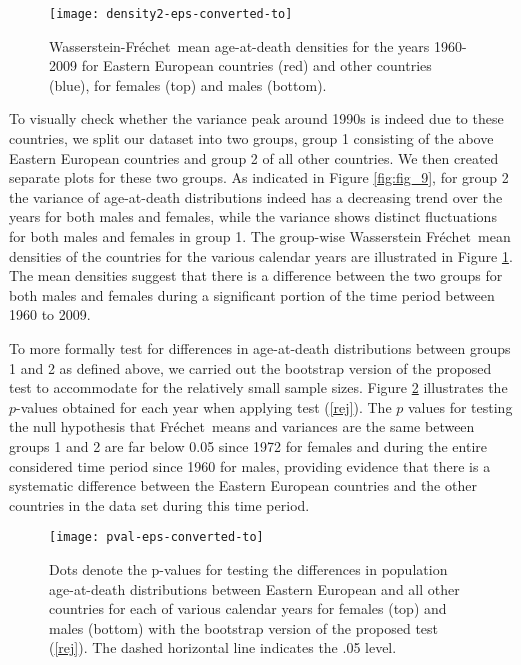 \documentclass[lineno]{biometrika}
\def\F{Fr\'{e}chet}
\begin{document}
\begin{figure}
	\centering
	\texttt{[image: density2-eps-converted-to]}
	\caption{Wasserstein-\F \ mean age-at-death densities for  the years 1960-2009 for Eastern European countries (red) and other countries (blue), for females (top) and males (bottom). }
	\label{fig:fig_10}
\end{figure}
To visually check whether the variance peak around 1990s is indeed due to these countries, we  split our dataset into two groups, group 1 consisting  of the above Eastern European countries and group 2 of all other countries. We then created separate   plots for these two groups.  As indicated in Figure \ref{fig:fig_9},  for group 2 the variance of age-at-death distributions indeed has a decreasing trend over the years for both males and females, while the variance shows distinct fluctuations for  both males and females in group 1.  The group-wise Wasserstein \F \ mean densities of the countries for the various calendar years are illustrated in Figure \ref{fig:fig_10}. The mean densities suggest that there is a  difference between the two groups for both males and females during a significant portion of the time period between 1960 to 2009.

To more formally  test for differences in age-at-death distributions between groups 1 and 2 as defined above, we carried out the  bootstrap version of the proposed test to accommodate for the relatively small sample sizes. Figure \ref{fig:fig_11} illustrates  the $p$-values obtained for each year when applying test (\ref{rej}).  The $p$ values for testing the null hypothesis that \F\ means and variances are the same between groups 1 and 2 are far below 0.05 since 1972 for females and during the entire considered time period since 1960 for males, providing  evidence that there is a systematic difference between the Eastern European countries and the other countries in the data set during this time period. 



\begin{figure}
	\centering
	\texttt{[image: pval-eps-converted-to]}
	\caption{Dots denote the p-values for testing the differences in population age-at-death distributions between Eastern European and all other countries for each of various calendar  years for females (top) and males (bottom) with the bootstrap version of the proposed test (\ref{rej}). The dashed horizontal line indicates the .05 level.}
	\label{fig:fig_11}
\end{figure}
\end{document}
